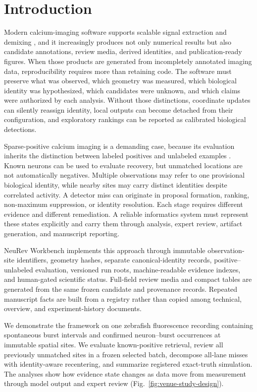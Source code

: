 \section{Introduction}

Modern calcium-imaging software supports scalable signal extraction and
demixing \citep{pnevmatikakis2016simultaneous,giovannucci2019caiman}, and it
increasingly produces not only numerical results but also
candidate annotations, review media, derived identities, and publication-ready
figures. When those products are generated from incompletely annotated imaging
data, reproducibility requires more than retaining code. The software must
preserve what was observed, which geometry was measured, which biological
identity was hypothesized, which candidates were unknown, and which claims were
authorized by each analysis. Without those distinctions, coordinate updates can
silently reassign identity, local outputs can become detached from their
configuration, and exploratory rankings can be reported as calibrated
biological detections.

Sparse-positive calcium imaging is a demanding case, because its evaluation
inherits the distinction between labeled positives and unlabeled examples
\citep{bekker2020pu}. Known neurons can be used
to evaluate recovery, but unmatched locations are not automatically negatives.
Multiple observations may refer to one provisional biological identity, while
nearby sites may carry distinct identities despite correlated activity. A
detector miss can originate in proposal formation, ranking, non-maximum
suppression, or identity resolution. Each stage requires different evidence and
different remediation. A reliable informatics system must represent these
states explicitly and carry them through analysis, expert review, artifact
generation, and manuscript reporting.

NeuRev Workbench implements this approach through immutable observation-site
identifiers, geometry hashes, separate canonical-identity records,
positive--unlabeled evaluation, versioned run roots, machine-readable evidence
indexes, and human-gated scientific status. Full-field review media and compact
tables are generated from the same frozen candidate and provenance records.
Repeated manuscript facts are built from a registry rather than copied among
technical, overview, and experiment-history documents.

We demonstrate the framework on one zebrafish fluorescence recording containing
\VenueCohortBursts{} spontaneous burst intervals and
\VenueCohortOccurrences{} confirmed neuron--burst occurrences at
\VenueCohortSites{} immutable spatial sites. We evaluate known-positive
retrieval, review all \VenueReviewedCandidates{} previously unmatched sites in
a frozen selected batch, decompose \VenueStrictMissed{} all-lane misses with
identity-aware recentering, and summarize registered exact-truth simulation.
The analyses show how evidence state changes as data move from measurement
through model output and expert review (Fig.~\ref{fig:venue-study-design}).

